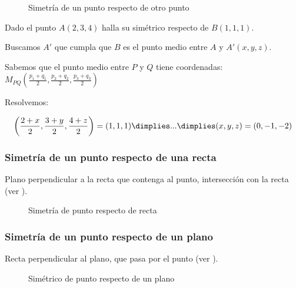 \begin{figure}[H]
\centering
{}

\caption{Simetría de un punto respecto de otro punto}
\label{fig::sim::punto-punto}
\end{figure}


\begin{problem}

Dado el punto $A(2,3,4)$ halla su simétrico respecto de $B(1,1,1)$.

\solution

Buscamos $A'$ que cumpla que $B$ es el punto medio entre $A$ y $A'(x,y,z)$.

Sabemos que el punto medio entre $P$ y $Q$ tiene coordenadas:$M_{PQ}\left(\frac{p_1+q_1}{2},\frac{p_2+q_2}{2},\frac{p_3+q_3}{2}\right)$

Resolvemos:

\[
\left(\frac{2+x}{2},\frac{3+y}{2},\frac{4+z}{2}\right) = (1,1,1) \dimplies ... \dimplies (x,y,z) = (0,-1,-2)
\]

\end{problem}


\subsubsection{Simetría de un punto respecto de una recta}

Plano perpendicular a la recta que contenga al punto, intersección con la recta (ver ).

\begin{figure}[H]
\centering
{}

\caption{Simetría de punto respecto de recta}
\label{fig::sim::punto-recta}
\end{figure}


\subsubsection{Simetría de un punto respecto de un plano}

Recta perpendicular al plano, que pasa por el punto (ver ).

\begin{figure}[H]
\centering
{}

\caption{Simétrico de punto respecto de un plano}
\label{fig::sim::punto-plano}
\end{figure}



